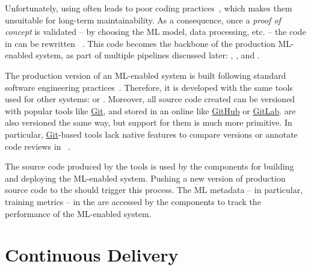   Unfortunately, using  often leads to poor
  coding practices~\parencite{Ferreira2024BeingProject,Pimentel2019ANotebooks,
  Shankar2022OperationalizingStudy}, which makes them unsuitable for
  long-term maintainability. As a consequence, once a \emph{proof of concept}
  is validated -- by choosing the ML model, data processing, etc. --
  the code in  can be rewritten%
  ~\parencite{Ferreira2024BeingProject,Huyen2022DesigningApplications,
  Wilson2022MachineAction}. This code becomes the backbone of the production
  ML-enabled system, as part of multiple pipelines discussed later:
    ,
    , and
    .
  
  The production version of an ML-enabled system is built following standard
  software engineering practices~\parencite{Huyen2022DesigningApplications, 
  Wilson2022MachineAction}. Therefore, it is developed with the same tools
  used for other systems:  or 
  .
  Moreover, all source code created can be versioned with
  popular tools like \href{https://git-scm.com}{Git},
  and stored in an online  like
  \href{https://github.com}{GitHub} or \href{https://gitlab.com}{GitLab}.
   are also versioned the same way,
  but support for them is much more primitive.
  In particular, \href{https://git-scm.com}{Git}-based tools lack
  native features to compare versions or annotate code reviews in
  ~\parencite{Ferreira2024BeingProject}.

  The source code produced by the  tools is
  used by the  components for building
  and deploying the ML-enabled system. Pushing a new version of production
  source code to the  should trigger
  this process. The ML metadata -- in particular, training metrics --
  in the  are accessed by the 
   components to track the performance
  of the ML-enabled system.

  \section{Continuous Delivery}
  \label{sec:ref_continuous_delivery}


